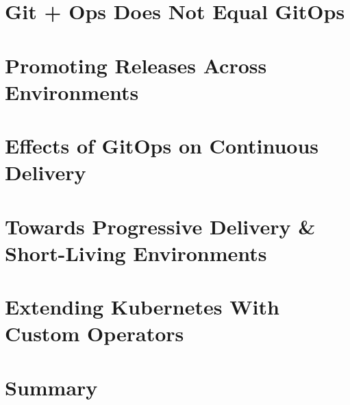 \section{Git + Ops Does Not Equal GitOps}

\section{Promoting Releases Across Environments}

\section{Effects of GitOps on Continuous Delivery}

\section{Towards Progressive Delivery \& Short-Living Environments}

\section{Extending Kubernetes With Custom Operators}

\section{Summary}


